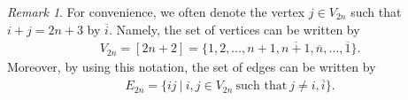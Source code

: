 \documentclass[12pt]{amsart}
\theoremstyle{remark}
\newtheorem{remark}{Remark}[section]
\numberwithin{equation}{section}
\begin{document}
\begin{remark}
For convenience, we often denote the vertex $j\in V_{2n}$ such that $i+j=2n+3$ by  $\overline{i}$.
Namely, the set of vertices can be written by
\begin{align*}
V_{2n}=[2n+2]=\{1,2,\ldots, n+1, \overline{n+1},\overline{n},\ldots, \overline{1}\}.
\end{align*}
Moreover, by using this notation, the set of edges can be written by
\begin{align*}
E_{2n}=\{ij\ |\ i,j\in V_{2n}\ \text{such that}\ j\not=i, \overline{i} \}.
\end{align*}
\end{remark}
\end{document}
